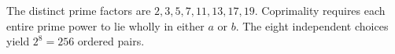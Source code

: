 The distinct prime factors are $2,3,5,7,11,13,17,19$. Coprimality requires each entire prime power to lie wholly in either $a$ or $b$. The eight independent choices yield $\boxed{2^8=256}$ ordered pairs.
